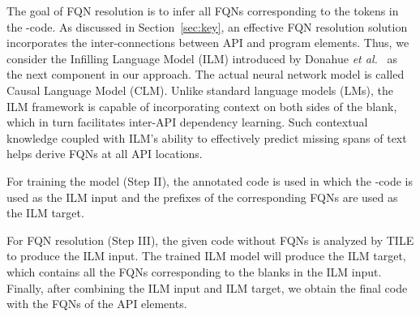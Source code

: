 The goal of FQN resolution is to infer all FQNs corresponding to the
\code{[blank]} tokens in the \code{[blank]}-code. As discussed in
Section~\ref{sec:key}, an effective FQN resolution solution
incorporates the inter-connections between API and program
elements. Thus, we consider the Infilling Language Model (ILM)
introduced by Donahue {\em et al.}~\cite{} as the next component in
our approach. The actual neural network model is called Causal
Language Model (CLM). Unlike standard language models (LMs), the ILM
framework is capable of incorporating context on both sides of the
blank, which in turn facilitates inter-API dependency learning. Such
contextual knowledge coupled with ILM's ability to effectively predict
missing spans of text helps \tool derive FQNs at all API
locations.

For training the model (Step II), the annotated code is used
in which the \code{[blank]}-code is used as the ILM input and the prefixes
of the corresponding FQNs are used as the ILM target.

For FQN resolution (Step III), the given code without FQNs is analyzed
by TILE to produce the ILM input. The trained ILM model will produce
the ILM target, which contains all the FQNs corresponding to the
blanks in the ILM input. Finally, after combining the ILM input and
ILM target, we obtain the final code with the FQNs of the API elements.


